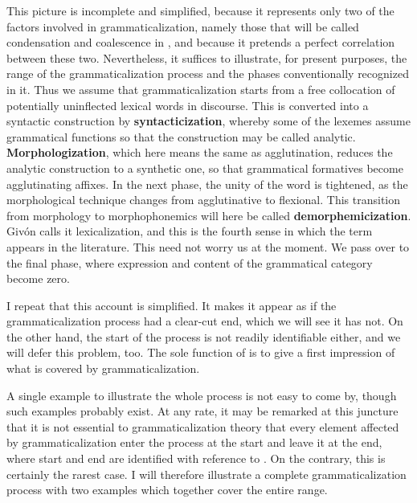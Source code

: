 This picture is incomplete and simplified, because it represents only two of the factors involved in grammaticalization, namely those that will be called condensation and coalescence in , and because it pretends a perfect correlation between these two. Nevertheless, it suffices to illustrate, for present purposes, the range of the grammaticalization process and the phases conventionally recognized in it. Thus we assume that grammaticalization starts from a free collocation of potentially uninflected lexical words in discourse. This is converted into a syntactic construction by \textbf{syntacticization}, whereby some of the lexemes assume grammatical functions so that the construction may be called analytic. \textbf{Morphologization}, which here means the same as agglutination, reduces the analytic construction to a synthetic one, so that grammatical formatives become agglutinating affixes. In the next phase, the unity of the word is tightened, as the morphological technique changes from agglutinative to flexional. This transition from morphology to morphophonemics will here be called \textbf{demorphemicization}. Givón calls it lexicalization, and this is the fourth sense in which the term appears in the literature. This need not worry us at the moment. We pass over to the final phase, where expression and content of the grammatical category become zero.

I repeat that this account is simplified. It makes it appear as if the grammaticalization process had a clear-cut end, which we will see it has not. On the other hand, the start of the process is not readily identifiable either, and we will defer this problem, too. The sole function of  is to give a first impression of what is covered by grammaticalization.

A single example to illustrate the whole process is not easy to come by, though such examples probably exist. At any rate, it may be remarked at this juncture that it is not essential to grammaticalization theory that every element affected by grammaticalization enter the process at the start and leave it at the end, where start and end are identified with reference to . On the contrary, this is certainly the rarest case. I will therefore illustrate a complete grammaticalization process with two examples which together cover the entire range.

